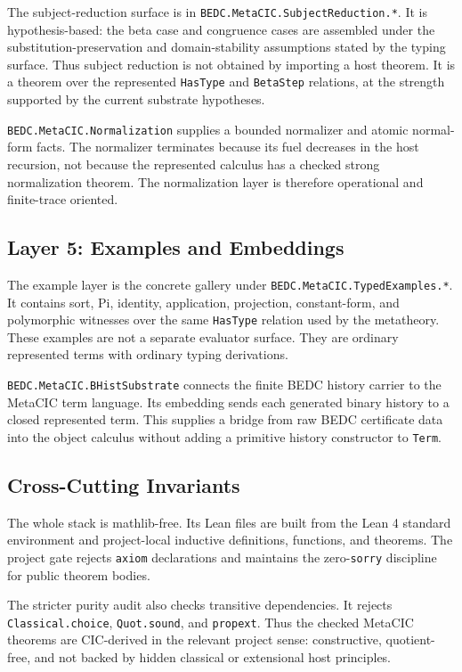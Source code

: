 The subject-reduction surface is in
\texttt{BEDC.MetaCIC.SubjectReduction.*}. It is hypothesis-based: the beta
case and congruence cases are assembled under the substitution-preservation
and domain-stability assumptions stated by the typing surface. Thus subject
reduction is not obtained by importing a host theorem. It is a theorem over
the represented \texttt{HasType} and \texttt{BetaStep} relations, at the
strength supported by the current substrate hypotheses.

\texttt{BEDC.MetaCIC.Normalization} supplies a bounded normalizer and atomic
normal-form facts. The normalizer terminates because its fuel decreases in
the host recursion, not because the represented calculus has a checked strong
normalization theorem. The normalization layer is therefore operational and
finite-trace oriented.

\subsection{Layer 5: Examples and Embeddings}
\label{subsec:substrate-layer-examples-embeddings}

The example layer is the concrete gallery under
\texttt{BEDC.MetaCIC.TypedExamples.*}. It contains sort, Pi, identity,
application, projection, constant-form, and polymorphic witnesses over the
same \texttt{HasType} relation used by the metatheory. These examples are not
a separate evaluator surface. They are ordinary represented terms with
ordinary typing derivations.

\texttt{BEDC.MetaCIC.BHistSubstrate} connects the finite BEDC history carrier
to the MetaCIC term language. Its embedding sends each generated binary
history to a closed represented term. This supplies a bridge from raw BEDC
certificate data into the object calculus without adding a primitive history
constructor to \texttt{Term}.

\subsection{Cross-Cutting Invariants}
\label{subsec:substrate-stack-cross-cutting-invariants}

The whole stack is mathlib-free. Its Lean files are built from the Lean 4
standard environment and project-local inductive definitions, functions, and
theorems. The project gate rejects \texttt{axiom} declarations and maintains
the zero-\texttt{sorry} discipline for public theorem bodies.

The stricter purity audit also checks transitive dependencies. It rejects
\texttt{Classical.choice}, \texttt{Quot.sound}, and \texttt{propext}. Thus the
checked MetaCIC theorems are CIC-derived in the relevant project sense:
constructive, quotient-free, and not backed by hidden classical or
extensional host principles.

